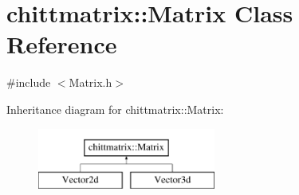 \hypertarget{classchittmatrix_1_1Matrix}{\section{chittmatrix\-:\-:\-Matrix \-Class \-Reference}
\label{classchittmatrix_1_1Matrix}
}


{\ttfamily \#include $<$\-Matrix.\-h$>$}

\-Inheritance diagram for chittmatrix\-:\-:\-Matrix\-:\begin{figure}[H]
\begin{center}
\leavevmode
\includegraphics[height=2.000000cm]{classchittmatrix_1_1Matrix}
\end{center}
\end{figure}
